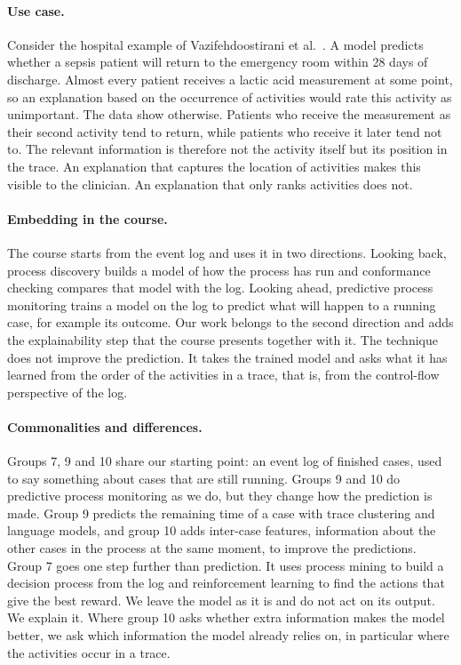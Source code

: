 \documentclass{article}
\begin{document}
\paragraph{Use case.}
Consider the hospital example of Vazifehdoostirani et al.~\cite{vazifehdoostirani2024}. A model predicts whether a sepsis patient will return to the emergency room within 28 days of discharge. Almost every patient receives a lactic acid measurement at some point, so an explanation based on the occurrence of activities would rate this activity as unimportant. The data show otherwise. Patients who receive the measurement as their second activity tend to return, while patients who receive it later tend not to. The relevant information is therefore not the activity itself but its position in the trace. An explanation that captures the location of activities makes this visible to the clinician. An explanation that only ranks activities does not.

\paragraph{Embedding in the course.}
The course starts from the event log and uses it in two directions. Looking back, process discovery builds a model of how the process has run and conformance checking compares that model with the log. Looking ahead, predictive process monitoring trains a model on the log to predict what will happen to a running case, for example its outcome. Our work belongs to the second direction and adds the explainability step that the course presents together with it. The technique does not improve the prediction. It takes the trained model and asks what it has learned from the order of the activities in a trace, that is, from the control-flow perspective of the log.



\paragraph{Commonalities and differences.}
Groups 7, 9 and 10 share our starting point: an event log of finished cases, used to say something about cases that are still running. Groups 9 and 10 do predictive process monitoring as we do, but they change how the prediction is made. Group 9 predicts the remaining time of a case with trace clustering and language models, and group 10 adds inter-case features, information about the other cases in the process at the same moment, to improve the predictions. Group 7 goes one step further than prediction. It uses process mining to build a decision process from the log and reinforcement learning to find the actions that give the best reward. We leave the model as it is and do not act on its output. We explain it. Where group 10 asks whether extra information makes the model better, we ask which information the model already relies on, in particular where the activities occur in a trace.
\end{document}
